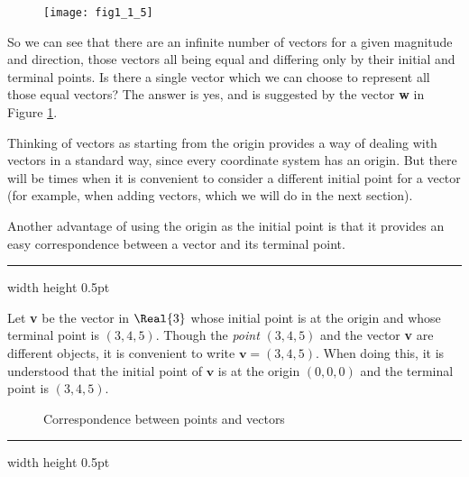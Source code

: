 \begin{figure}[h]
 \begin{center}
  \texttt{[image: fig1\_1\_5]}
 \end{center}
 \caption[]{}
 \label{fig:veceq}
\end{figure}

So we can see that there are an infinite number of vectors for a given magnitude and direction, those vectors all
being equal and differing only by their initial and terminal points.  Is there a single vector which we can choose to
represent all those equal vectors?  The answer is yes, and is suggested by the vector \textbf{w} in Figure
\ref{fig:veceq}.
\newpage
{}

\vspace{3mm}
Thinking of vectors as starting from the origin provides a way of dealing with vectors in a standard way, since every
coordinate system has an origin.  But there
will be times when it is convenient to consider a different initial point for a vector (for example, when adding
vectors, which we will do in the next section).

Another advantage of using the origin as the initial point is that it provides an easy correspondence between a
vector and its terminal point.

\vspace{4mm}
\hrule width \textwidth height 0.5pt
\begin{exmp}
 Let \textbf{v} be the vector in $\Real{3}$ whose initial point is at the origin and whose terminal point
 is $(3,4,5)$.  Though the \emph{point} $(3,4,5)$ and the vector \textbf{v} are different objects, it is
 convenient to write $\textbf{v} = (3,4,5)$.  When doing this, it is understood that the initial point of $\textbf{v}$
 is at the origin $(0,0,0)$ and the terminal point is $(3,4,5)$.
\end{exmp}

\begin{figure}[h]
 \centering
 \qquad\qquad
 \caption[]{\quad Correspondence between points and vectors}
 \label{fig:corresp}
\end{figure}
\hrule width \textwidth height 0.5pt
\vspace{4mm}

